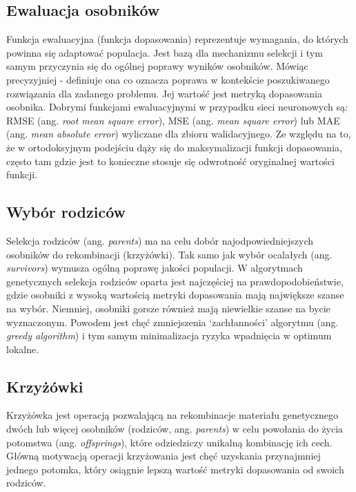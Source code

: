 \documentclass[a4paper,12pt]{article}
\numberwithin{figure}{section}
\begin{document}
    \subsection{Ewaluacja osobników}

    Funkcja ewaluacyjna (funkcja dopasowania) reprezentuje wymagania, do których powinna się adaptować populacja. Jest bazą dla mechanizmu selekcji i tym samym przyczynia się do ogólnej poprawy wyników osobników. Mówiąc precyzyjniej - definiuje ona co oznacza poprawa w kontekście poszukiwanego rozwiązania dla zadanego problemu. Jej wartość jest metryką dopasowania osobnika\cite{IntroductionToEvolutionaryComputing2015}. Dobrymi funkcjami ewaluacyjnymi w przypadku sieci neuronowych są: RMSE (ang. \textit{root mean square error}), MSE (ang. \textit{mean square error}) lub MAE (ang. \textit{mean absolute error}) wyliczane dla zbioru walidacyjnego. Ze względu na to, że w ortodoksyjnym podejściu dąży się do maksymalizacji funkcji dopasowania, często tam gdzie jest to konieczne stosuje się odwrotność oryginalnej wartości funkcji\cite{IntroductionToEvolutionaryComputing2015}.

    \subsection{Wybór rodziców}

    Selekcja rodziców (ang. \textit{parents}) ma na celu dobór najodpowiedniejszych osobników do rekombinacji (krzyżówki). Tak samo jak wybór ocalałych (ang. \textit{survivors}) wymusza ogólną poprawę jakości populacji. W algorytmach genetycznych selekcja rodziców oparta jest najczęściej na prawdopodobieństwie, gdzie osobniki z wysoką wartością metryki dopasowania mają największe szanse na wybór. Niemniej, osobniki gorsze również mają niewielkie szanse na bycie wyznaczonym. Powodem jest chęć zmniejszenia `zachłanności' algorytmu (ang. \textit{greedy algorithm}) i tym samym minimalizacja ryzyka wpadnięcia w optimum lokalne\cite{IntroductionToEvolutionaryComputing2015}.

    \subsection{Krzyżówki}

    Krzyżówka jest operacją pozwalającą na rekombinacje materiału genetycznego dwóch lub więcej osobników (rodziców, ang. \textit{parents}) w celu powołania do życia potomstwa (ang. \textit{offsprings}), które odziedziczy unikalną kombinację ich cech. Główną motywacją operacji krzyżowania jest chęć uzyskania przynajmniej jednego potomka, który osiągnie lepszą wartość metryki dopasowania od swoich rodziców\cite{GeneticAlgorithmEssentials2017}.
\end{document}
